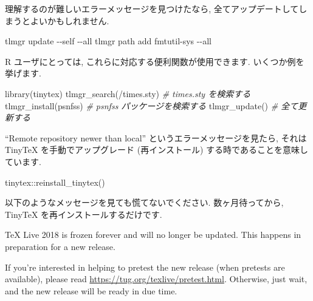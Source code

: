 \documentclass[
  xelatex,ja=standard,jafont=noto]{bxjsreport}
\newenvironment{Shaded}{\begin{snugshade}}{\end{snugshade}}
\newcommand{\AttributeTok}[1]{\textcolor[rgb]{0.77,0.63,0.00}{#1}}
\newcommand{\CommentTok}[1]{\textcolor[rgb]{0.56,0.35,0.01}{\textit{#1}}}
\newcommand{\ExtensionTok}[1]{#1}
\newcommand{\FunctionTok}[1]{\textcolor[rgb]{0.00,0.00,0.00}{#1}}
\newcommand{\NormalTok}[1]{#1}
\newcommand{\SpecialCharTok}[1]{\textcolor[rgb]{0.00,0.00,0.00}{#1}}
\newcommand{\StringTok}[1]{\textcolor[rgb]{0.31,0.60,0.02}{#1}}
\renewenvironment{quote}{\def\FrameCommand{{\color{quotebarcolor}{\vrule width 3pt}}\hspace{10pt}}\MakeFramed{\advance\hsize-\width\FrameRestore}}{\endMakeFramed}
\begin{document}
理解するのが難しいエラーメッセージを見つけたなら,
全てアップデートしてしまうとよいかもしれません.

\begin{Shaded}
\begin{Highlighting}[]
\ExtensionTok{tlmgr}\NormalTok{ update }\AttributeTok{{-}{-}self} \AttributeTok{{-}{-}all}
\ExtensionTok{tlmgr}\NormalTok{ path add}
\ExtensionTok{fmtutil{-}sys} \AttributeTok{{-}{-}all}
\end{Highlighting}
\end{Shaded}

R ユーザにとっては, これらに対応する便利関数が使用できます.
いくつか例を挙げます.

\begin{Shaded}
\begin{Highlighting}[]
\FunctionTok{library}\NormalTok{(tinytex)}
\FunctionTok{tlmgr\_search}\NormalTok{(}\StringTok{\textquotesingle{}/times.sty\textquotesingle{}}\NormalTok{)   }\CommentTok{\# times.sty を検索する}
\FunctionTok{tlmgr\_install}\NormalTok{(}\StringTok{\textquotesingle{}psnfss\textquotesingle{}}\NormalTok{)      }\CommentTok{\# psnfss パッケージを検索する}
\FunctionTok{tlmgr\_update}\NormalTok{()               }\CommentTok{\# 全て更新する}
\end{Highlighting}
\end{Shaded}

``Remote repository newer than local'' というエラーメッセージを見たら,
それは TinyTeX を手動でアップグレード (再インストール)
する時であることを意味しています.

\begin{Shaded}
\begin{Highlighting}[]
\NormalTok{tinytex}\SpecialCharTok{::}\FunctionTok{reinstall\_tinytex}\NormalTok{()}
\end{Highlighting}
\end{Shaded}

以下のようなメッセージを見ても慌てないでください. 数ヶ月待ってから,
TinyTeX を再インストールするだけです.

\begin{quote}
TeX Live 2018 is frozen forever and will no longer be updated. This
happens in preparation for a new release.
\end{quote}

\begin{quote}
If you're interested in helping to pretest the new release (when
pretests are available), please read
\url{https://tug.org/texlive/pretest.html}. Otherwise, just wait, and
the new release will be ready in due time.
\end{quote}
\end{document}
